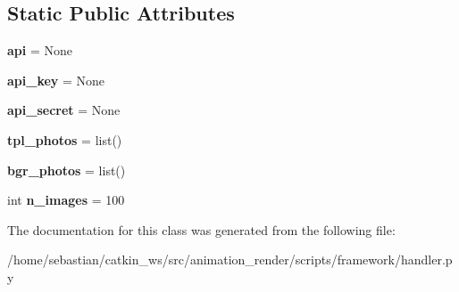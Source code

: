 \subsection*{Static Public Attributes}
\begin{DoxyCompactItemize}
\item 
{\bfseries api} = None\hypertarget{classhandler_1_1ImageHandler_af5bbbd2c02698984e0b52ef5cf94bb29}{}\label{classhandler_1_1ImageHandler_af5bbbd2c02698984e0b52ef5cf94bb29}

\item 
{\bfseries api\+\_\+key} = None\hypertarget{classhandler_1_1ImageHandler_a23bfcc80b559add0657f6e221061badd}{}\label{classhandler_1_1ImageHandler_a23bfcc80b559add0657f6e221061badd}

\item 
{\bfseries api\+\_\+secret} = None\hypertarget{classhandler_1_1ImageHandler_abcfe43f028a663a8eed04edb9263a939}{}\label{classhandler_1_1ImageHandler_abcfe43f028a663a8eed04edb9263a939}

\item 
{\bfseries tpl\+\_\+photos} = list()\hypertarget{classhandler_1_1ImageHandler_a61e9ca3066a5c19e3e3fc03fe56ebd85}{}\label{classhandler_1_1ImageHandler_a61e9ca3066a5c19e3e3fc03fe56ebd85}

\item 
{\bfseries bgr\+\_\+photos} = list()\hypertarget{classhandler_1_1ImageHandler_ad7079d7038bf4d3106a7fc8c4cf1c517}{}\label{classhandler_1_1ImageHandler_ad7079d7038bf4d3106a7fc8c4cf1c517}

\item 
int {\bfseries n\+\_\+images} = 100\hypertarget{classhandler_1_1ImageHandler_aebb5b0765eb118a0fdfb0cf4f5baf289}{}\label{classhandler_1_1ImageHandler_aebb5b0765eb118a0fdfb0cf4f5baf289}

\end{DoxyCompactItemize}


The documentation for this class was generated from the following file\+:\begin{DoxyCompactItemize}
\item 
/home/sebastian/catkin\+\_\+ws/src/animation\+\_\+render/scripts/framework/handler.\+py\end{DoxyCompactItemize}
